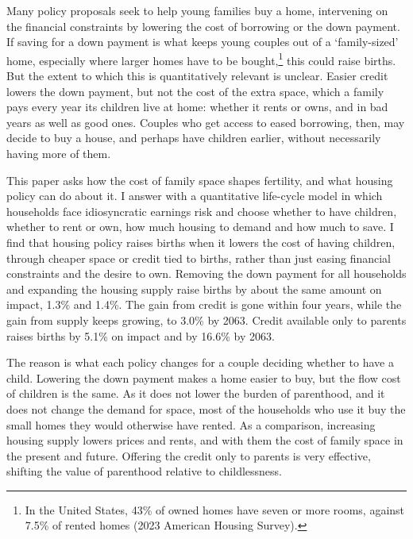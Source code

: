 Many policy proposals seek to help young families buy a home, intervening on the financial constraints by lowering the cost of borrowing or the down payment. If saving for a down payment is what keeps young couples out of a `family-sized' home, especially where larger homes have to be bought,\footnote{In the United States, 43\% of
owned homes have seven or more rooms, against 7.5\% of rented homes (2023
American Housing Survey).} this could raise births. But the extent to which this is quantitatively relevant is unclear. Easier credit lowers the down payment, but not the cost of the extra space, which a family pays every year its children live at home: whether it rents or owns, and in bad years as well as good ones. Couples who get access to eased borrowing, then, may decide to buy a house, and perhaps have children earlier, without necessarily having more of them.

This paper asks how the cost of family space shapes fertility, and what
housing policy can do about it. I answer with a quantitative life-cycle model in which households face idiosyncratic earnings risk and choose whether to have children, whether to rent or own, how much housing to demand and how much to save. I find that housing policy raises births when it lowers the cost of having children, through cheaper space or credit tied to births, rather than just easing financial constraints and the desire to own. Removing the down
payment for all households and expanding the housing supply raise births by
about the same amount on impact, 1.3\% and 1.4\%. The gain from credit is gone
within four years, while the gain from supply keeps growing, to 3.0\% by
2063. Credit available only to parents raises births by 5.1\% on impact and
by 16.6\% by 2063.

The reason is what each policy changes for a couple deciding whether to have a child. Lowering the down payment makes a home easier to buy, but the flow cost of children is the same. As it does not lower the burden of parenthood, and it does not change the demand for space, most of the households who use it buy the small homes they would otherwise have rented. As a comparison, increasing housing supply lowers prices and rents, and with them the cost of family space in the present and future. Offering the credit only to parents is very effective, shifting the value of parenthood relative to childlessness.

